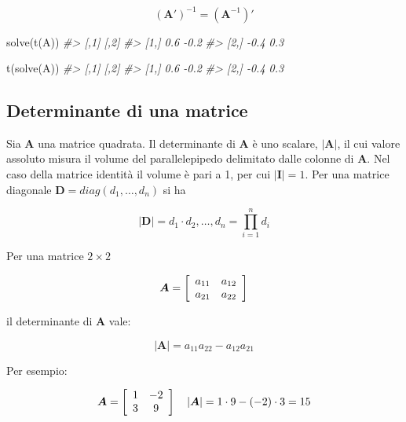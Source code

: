 \documentclass[
  11pt,
]{krantz}
\makeatletter
\newenvironment{Shaded}{\begin{snugshade}}{\end{snugshade}}
\newcommand{\CommentTok}[1]{\textcolor[rgb]{0.37,0.37,0.37}{\textit{#1}}}
\newcommand{\FunctionTok}[1]{\textcolor[rgb]{0,0,0}{#1}}
\newcommand{\NormalTok}[1]{#1}
\newenvironment{kframe}{%
\medskip{}
\setlength{\fboxsep}{.8em}
 \def\at@end@of@kframe{}%
 \ifinner\ifhmode%
  \def\at@end@of@kframe{\end{minipage}}%
  \begin{minipage}{\columnwidth}%
 \fi\fi%
 \def\FrameCommand##1{\hskip\@totalleftmargin \hskip-\fboxsep
 \colorbox{shadecolor}{##1}\hskip-\fboxsep
     \hskip-\linewidth \hskip-\@totalleftmargin \hskip\columnwidth}%
 \MakeFramed {\advance\hsize-\width
   \@totalleftmargin\z@ \linewidth\hsize
   \@setminipage}}%
 {\par\unskip\endMakeFramed%
 \at@end@of@kframe}
\renewenvironment{Shaded}{\begin{kframe}}{\end{kframe}}
\theoremstyle{definition}
\theoremstyle{definition}
\theoremstyle{definition}
\theoremstyle{definition}
\theoremstyle{remark}
\makeatother
\begin{document}
\[
(\boldsymbol{A}')^{-1}=(\boldsymbol{A}^{-1})'
\]

\begin{Shaded}
\begin{Highlighting}[]
\FunctionTok{solve}\NormalTok{(}\FunctionTok{t}\NormalTok{(A))}
\CommentTok{\#\textgreater{}      [,1] [,2]}
\CommentTok{\#\textgreater{} [1,]  0.6 {-}0.2}
\CommentTok{\#\textgreater{} [2,] {-}0.4  0.3}
\end{Highlighting}
\end{Shaded}

\begin{Shaded}
\begin{Highlighting}[]
\FunctionTok{t}\NormalTok{(}\FunctionTok{solve}\NormalTok{(A))}
\CommentTok{\#\textgreater{}      [,1] [,2]}
\CommentTok{\#\textgreater{} [1,]  0.6 {-}0.2}
\CommentTok{\#\textgreater{} [2,] {-}0.4  0.3}
\end{Highlighting}
\end{Shaded}

\hypertarget{determinante-di-una-matrice}{%
\subsection{Determinante di una matrice}\label{determinante-di-una-matrice}}

Sia \(\boldsymbol{A}\) una matrice quadrata. Il determinante di \(\boldsymbol{A}\) è uno scalare, \(|\boldsymbol{A}|\), il cui valore assoluto misura il volume del parallelepipedo delimitato dalle colonne di \(\boldsymbol{A}\). Nel caso della matrice identità il volume è pari a 1, per cui \(|\boldsymbol{I}| =1\). Per una matrice diagonale \(\boldsymbol{D} = diag(d_1, \dots, d_n)\) si ha

\[
|\boldsymbol{D}| =  d_1 \cdot d_2, \dots, d_n = \prod_{i=1}^{n}d_i
\]

Per una matrice \(2 \times 2\)

\[
\boldsymbol{A} =  \left[ \begin{array}{c c}
a_{11}& a_{12} \\
a_{21} & a_{22} \end{array} \right]
\]

il determinante di \(\boldsymbol{A}\) vale:

\[
|\boldsymbol{A}| =  a_{11}a_{22}-a_{12}a_{21}
\]

Per esempio:

\[
\boldsymbol{A} = \left[ \begin{array}{c c}
1 & -2 \\
3 & 9
\end{array}
 \right] \quad |\boldsymbol{A}| = 1\cdot 9 - (-2) \cdot  3 = 15
\]
\end{document}
